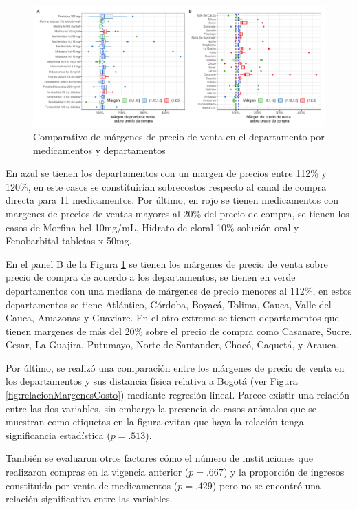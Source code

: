 \documentclass[
]{book}
\begin{document}
\begin{figure}[t]
\includegraphics[width=1\linewidth]{InformeFinal_files/figure-latex/boxplotComparativoPVTA-1} \caption{Comparativo de márgenes de precio de venta en el departamento por medicamentos y departamentos}\label{fig:boxplotComparativoPVTA}
\end{figure}

En azul se tienen los departamentos con un margen de precios entre 112\% y 120\%, en este casos se constituirían sobrecostos respecto al canal de compra directa para 11 medicamentos. Por último, en rojo se tienen medicamentos con margenes de precios de ventas mayores al 20\% del precio de compra, se tienen los casos de Morfina hcl 10mg/mL, Hidrato de cloral 10\% solución oral y Fenobarbital tabletas x 50mg.

En el panel B de la Figura \ref{fig:boxplotComparativoPVTA} se tienen los márgenes de precio de venta sobre precio de compra de acuerdo a los departamentos, se tienen en verde departamentos con una mediana de márgenes de precio menores al 112\%, en estos departamentos se tiene Atlántico, Córdoba, Boyacá, Tolima, Cauca, Valle del Cauca, Amazonas y Guaviare. En el otro extremo se tienen departamentos que tienen margenes de más del 20\% sobre el precio de compra como Casanare, Sucre, Cesar, La Guajira, Putumayo, Norte de Santander, Chocó, Caquetá, y Arauca.

Por último, se realizó una comparación entre los márgenes de precio de venta en los departamentos y sus distancia física relativa a Bogotá (ver Figura \ref{fig:relacionMargenesCosto}) mediante regresión lineal. Parece existir una relación entre las dos variables, sin embargo la presencia de casos anómalos que se muestran como etiquetas en la figura evitan que haya la relación tenga significancia estadística (\(p = .513\)).

También se evaluaron otros factores cómo el número de instituciones que realizaron compras en la vigencia anterior (\(p = .667\)) y la proporción de ingresos constituida por venta de medicamentos (\(p = .429\)) pero no se encontró una relación significativa entre las variables.
\end{document}
